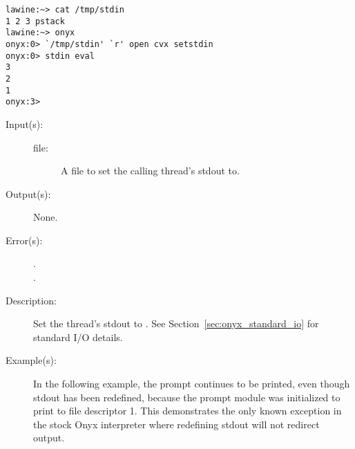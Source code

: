 \begin{description}
\begin{description}
\begin{verbatim}
lawine:~> cat /tmp/stdin
1 2 3 pstack
lawine:~> onyx
onyx:0> `/tmp/stdin' `r' open cvx setstdin
onyx:0> stdin eval
3
2
1
onyx:3>
		\end{verbatim}
	\end{description}
\label{systemdict:setstdout}
\item[{\onyxop{file}{setstdout}{--}}: ]
	\begin{description}\item[]
	\item[Input(s): ]
		\begin{description}\item[]
		\item[file: ]
			A file to set the calling thread's stdout to.
		\end{description}
	\item[Output(s): ] None.
	\item[Error(s): ]
		\begin{description}\item[]
		\item[.]
		\item[.]
		\end{description}
	\item[Description: ]
		Set the thread's stdout to .  See
		Section~\ref{sec:onyx_standard_io} for standard I/O details.
	\item[Example(s): ]
		In the following example, the prompt continues to be printed,
		even though stdout has been redefined, because the prompt module
		was initialized to print to file descriptor 1.  This
		demonstrates the only known exception in the stock Onyx
		interpreter where redefining stdout will not redirect output.
\begin{verbatim}


\end{verbatim}
\end{description}
\end{description}
